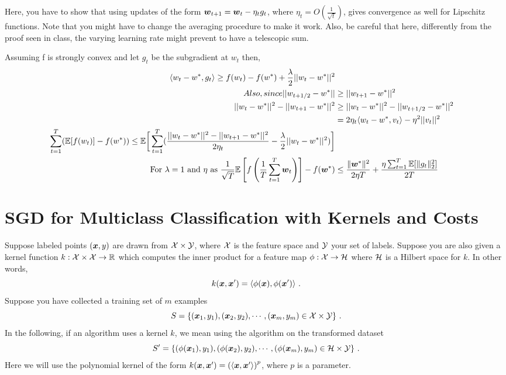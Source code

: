 \documentclass{article}
\begin{document}
Here, you have to show that using updates of the form $\boldsymbol{w}_{t+1}=\boldsymbol{w}_t-\eta_t g_t$, where $\eta_t=O(\frac{1}{\sqrt{t}})$, gives convergence as well for Lipschitz functions.
Note that you might have to change the averaging procedure to make it work. Also, be careful that here, differently from the proof seen in class, the varying learning rate might prevent to have a telescopic sum.
\begin{mdframed}[backgroundcolor=lightgray]
Assuming f is strongly convex and let $g_t$ be the subgradient at $w_t$ then,
\begin{align*}
\langle w_t - w^*, g_t\rangle \geq f(w_t) - f(w^*) + \frac{\lambda}{2}||w_t - w^*||^2\\
Also, since ||w_{t+1/2} - w^*|| &\geq ||w_{t+1} - w^*||^2\\
||w_{t} - w^*||^2 - ||w_{t+1} - w^*||^2 &\geq ||w_{t} - w^*||^2 - ||w_{t+1/2} - w^*||^2\\
&= 2 \eta_t \langle w_t - w^*, v_t\rangle - \eta^2||v_t||^2\\
\sum_{t=1}^T (\mathbb{E}[f(w_t)] - f(w^*)) \leq \mathbb{E} \bigg[\sum_{t=1}^T(\frac{||w_t - w^*||^2 - ||w_{t+1} - w^*||^2}{2\eta_t} - \frac{\lambda}{2}||w_t - w^*||^2)\bigg] \\
\text{For }\lambda = 1\text{ and }\eta\text{ as }\frac{1}{\sqrt{T}}
\mathbb{E}\left[f\left(\frac{1}{T}\sum_{t=1}^T \boldsymbol{w}_t\right)\right] - f(\boldsymbol{w}^*) &\leq \frac{\|\boldsymbol{w}^*\|^2}{2\eta T}+\frac{\eta \sum_{t=1}^T\mathbb{E}[\|g_t\|_2^2]}{2T}
\end{align*}
\end{mdframed}


\section{SGD for Multiclass Classification with Kernels and Costs}
Suppose labeled points $(\boldsymbol{x}, y)$ are drawn from $\mathcal{X} \times \mathcal{Y}$, where $\mathcal{X}$ is the feature space and $\mathcal{Y}$ your set of labels.
Suppose you are also given a kernel function $k : \mathcal{X} \times \mathcal{X} \rightarrow \mathbb{R}$ which computes the inner product for
a feature map $\phi : \mathcal{X} \rightarrow \mathcal{H}$ where $\mathcal{H}$ is a Hilbert space for $k$. In other words,
\[
k(\boldsymbol{x}, \boldsymbol{x}') = \langle \phi(\boldsymbol{x}), \phi(\boldsymbol{x}')\rangle~.
\]
Suppose you have collected a training set of $m$ examples
\[
S = \{(\boldsymbol{x}_1, y_1),(\boldsymbol{x}_2, y_2), \cdots ,(\boldsymbol{x}_m, y_m) \in \mathcal{X} \times \mathcal{Y}\}~.
\]
In the following, if an algorithm uses a kernel $k$, we mean using the algorithm on the transformed dataset
\[
S' = \{(\phi(\boldsymbol{x}_1), y_1),(\phi(\boldsymbol{x}_2), y_2),\cdots,(\phi(\boldsymbol{x}_m), y_m) \in \mathcal{H} \times \mathcal{Y}\}~.
\]
Here we will use the polynomial kernel of the form $k(\boldsymbol{x},\boldsymbol{x}')=\left(\langle\boldsymbol{x},\boldsymbol{x}'\rangle\right)^p$, where $p$ is a parameter.
\end{document}
